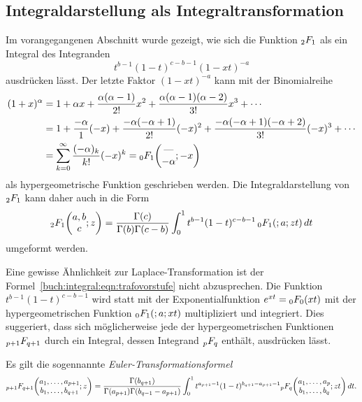 %
%
\subsection{Integraldarstellung als Integraltransformation}
Im vorangegangenen Abschnitt wurde gezeigt, wie sich die Funktion
$\mathstrut_2F_1$ als ein Integral des Integranden
\[
t^{b-1}(1-t)^{c-b-1} (1-xt)^{-a}
\]
ausdrücken lässt.
Der letzte Faktor $(1-xt)^{-a}$ kann mit der Binomialreihe
\begin{align*}
(1+x)^\alpha
&=
1
+ 
\alpha x
+
\frac{\alpha(\alpha-1)}{2!}x^2
+
\frac{\alpha(\alpha-1)(\alpha-2)}{3!}x^3
+
\cdots
\\
&=
1
+
\frac{-\alpha}{1}(-x)
+
\frac{-\alpha(-\alpha+1)}{2!} (-x)^2
+
\frac{-\alpha(-\alpha+1)(-\alpha+2)}{3!} (-x)^3
+
\cdots
\\
&=
\sum_{k=0}^\infty \frac{(-\alpha)_k}{k!} (-x)^k
=
\mathstrut_0F_1\biggl(
\begin{matrix}
\text{---}\\-\alpha
\end{matrix}
;-x
\biggr)
\end{align*}
als hypergeometrische Funktion geschrieben werden.
Die Integraldarstellung von $\mathstrut_2F_1$ kann daher auch 
in die Form
\begin{equation}
\mathstrut_2F_1\biggl(\begin{matrix}a,b\\c\end{matrix};z\biggr)
=
\frac{\Gamma(c)}{\Gamma(b)\Gamma(c-b)}
\int_0^1 t^{b-1}(1-t)^{c-b-1}
\,
\mathstrut_0F_1(;a;zt)\,dt
\label{buch:integral:eqn:trafovorstufe}
\end{equation}
umgeformt werden.

Eine gewisse Ähnlichkeit zur Laplace-Transformation ist der
Formel~\eqref{buch:integral:eqn:trafovorstufe} nicht abzusprechen.
Die Funktion \( t^{b-1}(1-t)^{c-b-1} \) wird statt mit der
Exponentialfunktion $e^{xt} = \mathstrut_0F_0(xt)$ mit der
hypergeometrischen Funktion $\mathstrut_0F_1(;a;xt)$ multipliziert und
integriert.
Dies suggeriert, dass sich möglicherweise jede der hypergeometrischen
Funktionen $\mathstrut_{p+1}F_{q+1}$ durch ein Integral, dessen 
Integrand $\mathstrut_pF_q$ enthält, ausdrücken lässt.

\begin{satz}
%
Es gilt die sogennannte {\em Euler-Transformationsformel}
%
\[
\mathstrut_{p+1}F_{q+1}\biggl(
\begin{matrix}
a_1,\dots,a_{p+1}\\
b_1,\dots,b_{q+1}
\end{matrix}
;z
\biggr)
=
\frac{\Gamma(b_{q+1})}{\Gamma(a_{p+1})\Gamma(b_{q-1}-a_{p+1})}
\int_0^1
t^{a_{p+1}-1}(1-t)^{b_{q+1}-a_{p+1}-1}
\mathstrut_pF_q\biggl(
\begin{matrix}
a_1,\dots,a_p\\
b_1,\dots,b_q
\end{matrix};zt
\biggr)
\,dt.
\]
\end{satz}

